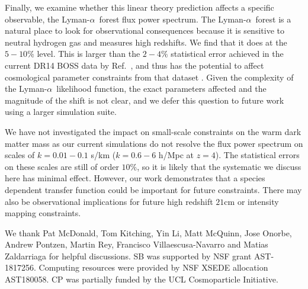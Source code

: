 \documentclass[a4paper,11pt]{article}
\newcommand{\Lya}{Lyman-$\alpha$}
\begin{document}
Finally, we examine whether this linear theory prediction affects a specific observable, the \Lya~forest flux power spectrum. The \Lya~forest is a natural place to look for observational consequences because it is sensitive to neutral hydrogen gas and measures high redshifts.
We find that it does at the $5-10\%$ level. This is larger than the $2-4\%$ statistical error achieved in the current DR14 BOSS data by Ref.~\cite{Chabanier:2019}, and thus has the potential to affect cosmological parameter constraints from that dataset \cite{PD2019}. Given the complexity of the \Lya~likelihood function, the exact parameters affected and the magnitude of the shift is not clear, and we defer this question to future work using a larger simulation suite.

We have not investigated the impact on small-scale constraints on the warm dark matter mass \cite{Irsic:2017} as our current simulations do not resolve the flux power spectrum on scales of $k = 0.01 - 0.1$ s/km ($k = 0.6 - 6$ h/Mpc at $z = 4$). The statistical errors on these scales are still of order $10\%$, so it is likely that the systematic we discuss here has minimal effect. However, our work demonstrates that a species dependent transfer function could be important for future constraints. There may also be observational implications for future high redshift $21$cm or intensity mapping constraints.


\acknowledgments

We thank Pat McDonald, Tom Kitching, Yin Li, Matt McQuinn, Jose Onorbe, Andrew Pontzen, Martin Rey, Francisco Villaescusa-Navarro and Matias Zaldarriaga for helpful discussions. SB was supported by NSF grant AST-1817256. Computing resources were provided by NSF XSEDE allocation AST180058. CP was partially funded by the UCL Cosmoparticle Initiative.
\end{document}
